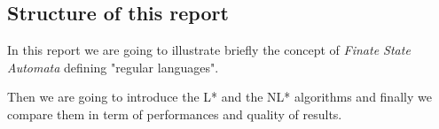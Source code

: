 \subsection{Structure of this report}
In this report we are going to illustrate briefly the concept of \textit{Finate State Automata} defining "regular languages".

Then we are going to introduce the L* \cite{LPaper} and the NL* \cite{NLPaper} algorithms and finally we compare them in term of performances and quality of results.